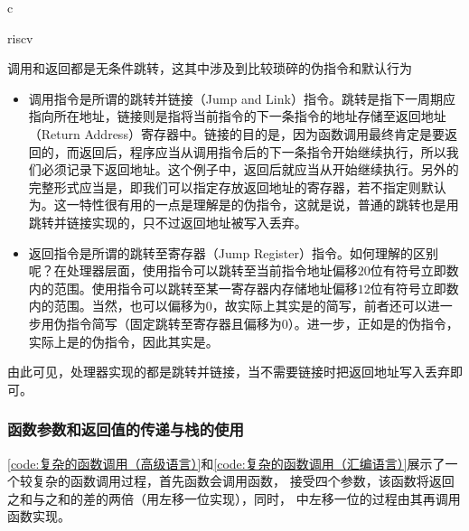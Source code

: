 \begin{Code}{c}
    
\end{Code}

\begin{Code}{riscv}
    
\end{Code}

调用和返回都是无条件跳转，这其中涉及到比较琐碎的伪指令和默认行为
\begin{itemize}
    \item 调用指令是所谓的跳转并链接（Jump and Link）指令。跳转是指下一周期应指向所在地址，链接则是指将当前指令的下一条指令的地址存储至返回地址（Return Address）寄存器中。链接的目的是，因为函数调用最终肯定是要返回的，而返回后，程序应当从调用指令后的下一条指令开始继续执行，所以我们必须记录下返回地址。这个例子中，返回后就应当从开始继续执行。另外的完整形式应当是，即我们可以指定存放返回地址的寄存器，若不指定则默认为。这一特性很有用的一点是理解是的伪指令，这就是说，普通的跳转也是用跳转并链接实现的，只不过返回地址被写入丢弃。
    \item 返回指令是所谓的跳转至寄存器（Jump Register）指令。如何理解的区别呢？在处理器层面，使用指令可以跳转至当前指令地址偏移$20$位有符号立即数内的范围。使用指令可以跳转至某一寄存器内存储地址偏移$12$位有符号立即数内的范围。当然，也可以偏移为$0$，故实际上其实是的简写，前者还可以进一步用伪指令简写（固定跳转至寄存器且偏移为$0$）。进一步，正如是的伪指令，实际上是的伪指令，因此其实是。
\end{itemize}

由此可见，处理器实现的都是跳转并链接，当不需要链接时把返回地址写入丢弃即可。

\subsubsection{函数参数和返回值的传递与栈的使用}
\cref{code:复杂的函数调用（高级语言）}和\cref{code:复杂的函数调用（汇编语言）}展示了一个较复杂的函数调用过程，首先函数会调用函数， 接受四个参数，该函数将返回之和与之和的差的两倍（用左移一位实现），同时， 中左移一位的过程由其再调用函数实现。

